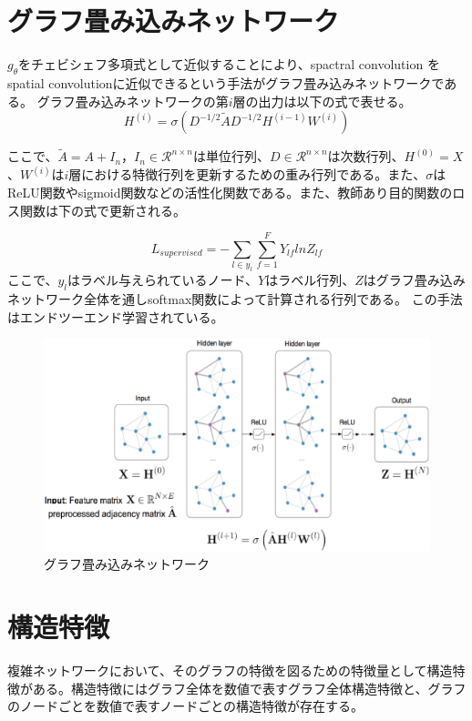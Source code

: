 \section{グラフ畳み込みネットワーク}
$g_{\theta}$をチェビシェフ多項式として近似することにより、spactral convolution を spatial convolutionに近似できるという手法がグラフ畳み込みネットワーク\cite{gcn}である。
グラフ畳み込みネットワークの第$i$層の出力は以下の式で表せる。
\begin{equation}
H^{(i)} = \sigma(D^{-1/2}\tilde{A}D^{-1/2}H^{(i-1)}W^{(i)})
\end{equation}

ここで、$\tilde{A}=A+I_{n}$，$I_{n}\in \mathcal{R}^{n \times n}$は単位行列、$D \in \mathcal{R}^{n \times n}$は次数行列、$H^{(0)}=X$、$W^{(i)}$は$i$層における特徴行列を更新するための重み行列である。また、$\sigma$はReLU関数やsigmoid関数などの活性化関数である。また、教師あり目的関数のロス関数は下の式で更新される。

\begin{equation}
L_{supervised} = - \sum_{l \in y_{l}} \sum_{f=1}^{F} Y_{lf} lnZ_{lf}
\end{equation}
ここで、$y_{l}$はラベル与えられているノード、$Y$はラベル行列、$Z$はグラフ畳み込みネットワーク全体を通しsoftmax関数によって計算される行列である。
この手法はエンドツーエンド学習されている。

\begin{figure}[h]
  \centering
  \includegraphics[width=1.0\hsize]{figures/gcn.eps}
  \caption{グラフ畳み込みネットワーク\cite{gcn}}
  \label{fig:ex1}
\end{figure}





\section{構造特徴}
複雑ネットワークにおいて、そのグラフの特徴を図るための特徴量として構造特徴がある。構造特徴にはグラフ全体を数値で表すグラフ全体構造特徴と、グラフのノードごとを数値で表すノードごとの構造特徴が存在する。
